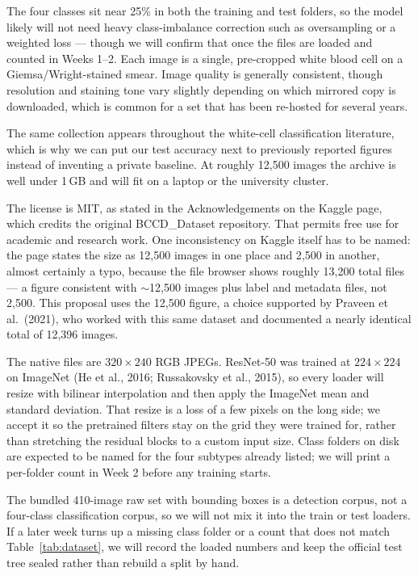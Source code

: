 \documentclass[11pt]{article}
\begin{document}
The four classes sit near 25\% in both the training and test folders, so the model likely will not need heavy class-imbalance correction such as oversampling or a weighted loss --- though we will confirm that once the files are loaded and counted in Weeks 1--2. Each image is a single, pre-cropped white blood cell on a Giemsa/Wright-stained smear. Image quality is generally consistent, though resolution and staining tone vary slightly depending on which mirrored copy is downloaded, which is common for a set that has been re-hosted for several years.

The same collection appears throughout the white-cell classification literature, which is why we can put our test accuracy next to previously reported figures instead of inventing a private baseline. At roughly 12{,}500 images the archive is well under 1\,GB and will fit on a laptop or the university cluster.

The license is MIT, as stated in the Acknowledgements on the Kaggle page, which credits the original BCCD\_Dataset repository. That permits free use for academic and research work. One inconsistency on Kaggle itself has to be named: the page states the size as 12{,}500 images in one place and 2{,}500 in another, almost certainly a typo, because the file browser shows roughly 13{,}200 total files --- a figure consistent with $\sim$12{,}500 images plus label and metadata files, not 2{,}500. This proposal uses the 12{,}500 figure, a choice supported by Praveen et al.\ (2021), who worked with this same dataset and documented a nearly identical total of 12{,}396 images.

The native files are $320\times 240$ RGB JPEGs. ResNet-50 was trained at $224\times 224$ on ImageNet (He et al., 2016; Russakovsky et al., 2015), so every loader will resize with bilinear interpolation and then apply the ImageNet mean and standard deviation. That resize is a loss of a few pixels on the long side; we accept it so the pretrained filters stay on the grid they were trained for, rather than stretching the residual blocks to a custom input size. Class folders on disk are expected to be named for the four subtypes already listed; we will print a per-folder count in Week 2 before any training starts.

The bundled 410-image raw set with bounding boxes is a detection corpus, not a four-class classification corpus, so we will not mix it into the train or test loaders. If a later week turns up a missing class folder or a count that does not match Table~\ref{tab:dataset}, we will record the loaded numbers and keep the official test tree sealed rather than rebuild a split by hand.
\end{document}
